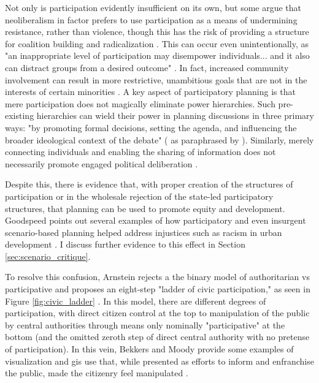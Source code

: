 Not only is participation evidently insufficient on its own, but some argue that neoliberalism in factor prefers to use participation as a means of undermining resistance, rather than violence, though this has the risk of providing a structure for coalition building and radicalization \cite{miraftabInsurgentPlanningSituating2016}. This can occur even unintentionally, as "an inappropriate level of participation may disempower individuals... and it also can distract groups from a desired outcome" \cite{sieberPublicParticipationGeographic2006}. In fact, increased community involvement can result in more restrictive, unambitious goals that are not in the interests of certain minorities \cite{wheatonIdentifyingPublicInterest1972}. A key aspect of participatory planning is that mere participation does not magically eliminate power hierarchies. Such pre-existing hierarchies can wield their power in planning discussions in 
three primary ways: "by promoting formal decisions, setting the agenda, and influencing the broader ideological context of the debate" (\cite{foresterPlanningFacePower2001} as paraphrased by \cite{goodspeedScenarioPlanningCities2020}). Similarly, merely connecting individuals and enabling the sharing of information does not necessarily promote engaged political deliberation \cite{gordonAugmentedDeliberationMerging2011}.

Despite this, there is evidence that, with proper creation of the structures of participation or in the wholesale rejection of the state-led participatory structures, that planning can be used to promote equity and development. Goodspeed points out several examples of how participatory and even insurgent scenario-based planning helped address injustices such as racism in urban development \cite{goodspeedScenarioPlanningCities2020}. I discuss further evidence to this effect in Section \ref{sec:scenario_critique}.

To resolve this confusion, Arnstein rejects a the binary model of authoritarian vs participative and proposes an eight-step "ladder of civic participation," as seen in Figure \ref{fig:civic_ladder} \cite{arnsteinLadderCitizenParticipation1969}. In this model, there are different degrees of participation, with direct citizen control at the top to manipulation of the public by central authorities through means only nominally "participative" at the bottom (and the omitted zeroth step of direct central authority with no pretense of participation). In this vein, Bekkers and Moody provide some examples of visualization and \ac{gis} use that, while presented as efforts to inform and enfranchise the public, made the citizenry feel manipulated \cite{bekkersVisualEventsElectronic2011}. 

